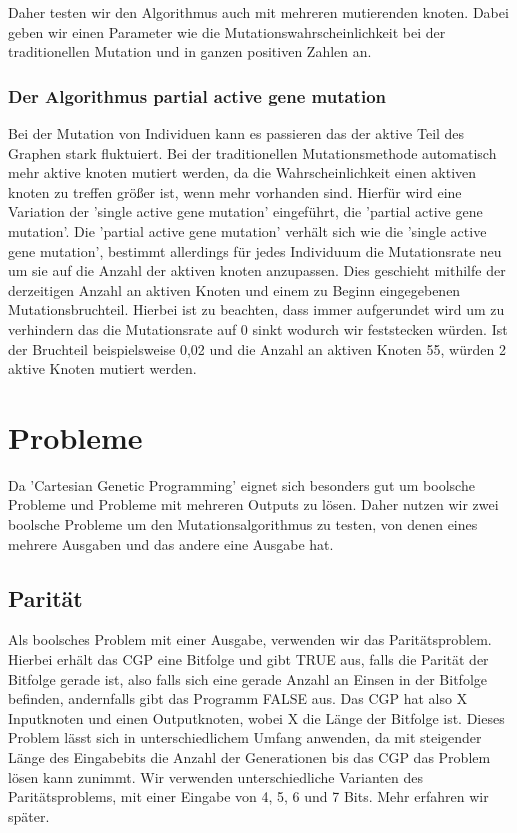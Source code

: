Daher testen wir den Algorithmus auch mit mehreren mutierenden knoten. Dabei geben wir einen Parameter wie die Mutationswahrscheinlichkeit bei der traditionellen Mutation und in ganzen positiven Zahlen an.

\subsubsection{Der Algorithmus partial active gene mutation}

Bei der Mutation von Individuen kann es passieren das der aktive Teil des Graphen stark fluktuiert. Bei der traditionellen Mutationsmethode automatisch mehr aktive knoten mutiert werden, da die Wahrscheinlichkeit einen aktiven knoten zu treffen größer ist, wenn mehr vorhanden sind. Hierfür wird eine Variation der 'single active gene mutation' eingeführt, die 'partial active gene mutation'. Die 'partial active gene mutation' verhält sich wie die 'single active gene mutation', bestimmt allerdings für jedes Individuum die Mutationsrate neu um sie auf die Anzahl der aktiven knoten anzupassen. Dies geschieht mithilfe der derzeitigen Anzahl an aktiven Knoten und einem zu Beginn eingegebenen Mutationsbruchteil. Hierbei ist zu beachten, dass immer aufgerundet wird um zu verhindern das die Mutationsrate auf 0 sinkt wodurch wir feststecken würden. Ist der Bruchteil beispielsweise 0,02 und die Anzahl an aktiven Knoten 55, würden 2 aktive Knoten mutiert werden.



\section{Probleme}

Da 'Cartesian Genetic Programming' eignet sich besonders gut um boolsche Probleme \cite{miller:1999:ACGP} und Probleme mit mehreren Outputs zu lösen. Daher nutzen wir zwei boolsche Probleme um den Mutationsalgorithmus zu testen, von denen eines mehrere Ausgaben und das andere eine Ausgabe hat.

\subsection{Parität}

Als boolsches Problem mit einer Ausgabe, verwenden wir das Paritätsproblem. Hierbei erhält das CGP eine Bitfolge und gibt TRUE aus, falls die Parität der Bitfolge gerade ist, also falls sich eine gerade Anzahl an Einsen in der Bitfolge befinden, andernfalls gibt das Programm FALSE aus. Das CGP hat also X Inputknoten und einen Outputknoten, wobei X die Länge der Bitfolge ist. Dieses Problem lässt sich in unterschiedlichem Umfang anwenden, da mit steigender Länge des Eingabebits die Anzahl der Generationen bis das CGP das Problem lösen kann zunimmt. Wir verwenden unterschiedliche Varianten des Paritätsproblems, mit einer Eingabe von 4, 5, 6 und 7 Bits. Mehr erfahren wir später.


